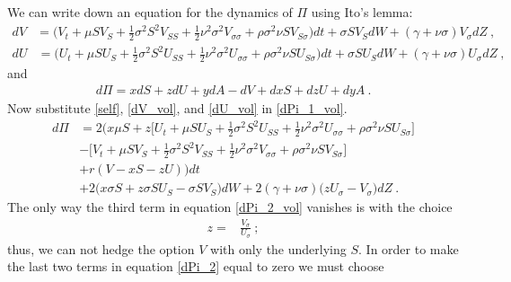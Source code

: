 \documentclass[10pt]{article}
\numberwithin{equation}{section}
\begin{document}
We can write down an equation for the dynamics of $\Pi$ using Ito's lemma:\begin{equation}\label{dV_vol}
	\begin{split}
	dV&= \biggl(V_t+\mu S V_S +\frac{1}{2} \sigma^2 S^2 V_{SS} + \frac{1}{2} \nu^2 \sigma^2 V_{\sigma\sigma}+\rho \sigma^2 \nu S V_{S\sigma} \biggr)dt + \sigma S V_S dW +(\gamma + \nu \sigma) V_{\sigma} dZ\:,
	\end{split}
\end{equation}
\begin{equation}\label{dU_vol}
	\begin{split}
	dU&= \biggl(U_t+\mu S U_S +\frac{1}{2} \sigma^2 S^2 U_{SS} + \frac{1}{2} \nu^2 \sigma^2 U_{\sigma\sigma} + \rho \sigma^2 \nu S U_{S\sigma}\biggr)dt + \sigma S U_S dW +(\gamma + \nu \sigma) U_{\sigma} dZ\:,
	\end{split}
\end{equation}
and
\begin{equation}\label{dPi_1_vol}
	\begin{split}
	d\Pi = x dS + z dU +y dA -dV + dx S  + dz U + dy A\:.
	\end{split}
\end{equation}
Now substitute \eqref{self}, \eqref{dV_vol}, and \eqref{dU_vol} in \eqref{dPi_1_vol}.
\begin{equation}\label{dPi_2_vol}
	\begin{split}
	d\Pi &= 2 \biggl( x \mu S + z \biggl[U_t +  \mu S U_{S} + \frac{1}{2} \sigma^2 S^2 U_{SS} + \frac{1}{2} \nu^2 \sigma^2 U_{\sigma\sigma} + \rho \sigma^2 \nu S U_{S\sigma}\biggr] \\
	&  - \biggl[ V_t  + \mu S V_S + \frac{1}{2} \sigma^2 S^2 V_{SS} + \frac{1}{2} \nu^2 \sigma^2 V_{\sigma\sigma} + \rho \sigma^2 \nu S V_{S\sigma} \biggr] \\
	& + r (V-xS-zU) \biggr)dt\\
	& + 2\biggl( x \sigma S + z \sigma S U_{S}  - \sigma S V_S \biggr) dW  + 2 (\gamma+\nu \sigma) \biggl( z U_{\sigma} -  V_{\sigma} \biggr) dZ\:.
	\end{split}
\end{equation}
The only way the third term in equation \eqref{dPi_2_vol} vanishes is with the choice
\begin{equation}
	\begin{split}
	z =& \frac{V_{\sigma}}{U_{\sigma}}\:;
	\end{split}
\end{equation}
thus, we can not hedge the option $V$ with only the underlying $S$. In order to make the last two terms in equation \eqref{dPi_2} equal to zero we must choose
\end{document}
